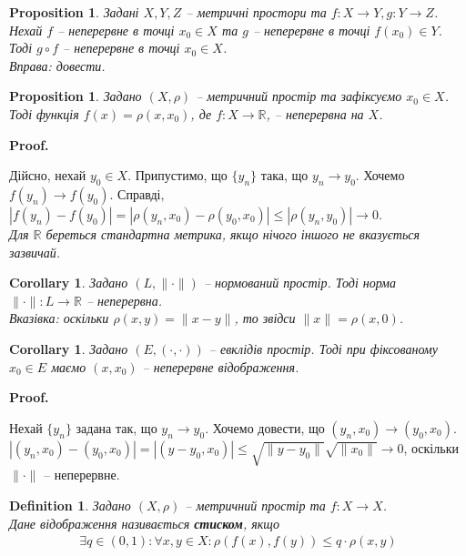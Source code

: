 \documentclass[a4paper, 10pt]{article}
\makeatletter
\theoremstyle{theoremdd}
\theoremstyle{theoremdd}
\newtheorem{definition}[theorem]{Definition}
\theoremstyle{theoremdd}
\theoremstyle{theoremdd}
\theoremstyle{theoremdd}
\newtheorem{proposition}[theorem]{Proposition}
\theoremstyle{theoremdd}
\theoremstyle{theoremdd}
\theoremstyle{theoremdd}
\newtheorem{corollary}[theorem]{Corollary}
\renewenvironment{proof}[1][Proof.\\]{\par
\pushQED{\hfill \qed}%
\normalfont \topsep6\p@\@plus6\p@\relax
\trivlist
\item\relax
{\bfseries
#1\@addpunct{.}}\hspace\labelsep\ignorespaces
}{%
\popQED\endtrivlist\@endpefalse
}
\makeatother
\begin{document}
\begin{proposition}
Задані $X,Y,Z$ -- метричні простори та $f \colon X \to Y, g \colon Y \to Z$. Нехай $f$ -- неперервне в точці $x_0 \in X$ та $g$ -- неперервне в точці $f(x_0) \in Y$. Тоді $g \circ f$ -- неперервне в точці $x_0 \in X$.\\
\textit{Вправа: довести.}
\end{proposition}

\begin{proposition}
Задано $(X,\rho)$ -- метричний простір та зафіксуємо $x_0 \in X$. Тоді функція $f(x) = \rho(x,x_0)$, де $f \colon X \to \mathbb{R}$, -- неперервна на $X$.
\end{proposition}

\begin{proof}
Дійсно, нехай $y_0 \in X$. Припустимо, що $\{y_n\}$ така, що  $y_n \to y_0$. Хочемо $f(y_n) \to f(y_0)$. Справді,\\
$|f(y_n) - f(y_0)| = |\rho(y_n,x_0) - \rho(y_0,x_0)| \leq |\rho(y_n,y_0)| \to 0$.\\
\textit{Для $\mathbb{R}$ береться стандартна метрика, якщо нічого іншого не вказується зазвичай.}
\end{proof}

\begin{corollary}
Задано $(L, \|\cdot \|)$ -- нормований простір. Тоді норма $\| \cdot \| \colon L \to \mathbb{R}$ -- неперервна.\\
\textit{Вказівка: оскільки $\rho(x,y) = \|x-y\|$, то звідси $\|x\| = \rho(x,0)$.}
\end{corollary}

\begin{corollary}
Задано $(E, (\cdot,\cdot))$ -- евклідів простір. Тоді при фіксованому $x_0 \in E$ маємо $(x,x_0)$ -- неперервне відображення.
\end{corollary}

\begin{proof}
Нехай $\{y_n\}$ задана так, що $y_n \to y_0$. Хочемо довести, що $(y_n,x_0) \to (y_0,x_0)$.\\
$|(y_n,x_0) - (y_0,x_0)| = |(y-y_0,x_0)| \leq \sqrt{\|y-y_0\|} \sqrt{\|x_0\|} \to 0$, оскільки $\| \cdot \|$ -- неперервне.
\end{proof}

\begin{definition}
Задано $(X,\rho)$ -- метричний простір та $f \colon X \to X$.\\
Дане відображення називається \textbf{стиском}, якщо
\begin{align*}
\exists q \in (0,1): \forall x,y \in X: \rho(f(x),f(y)) \leq q \cdot \rho(x,y)
\end{align*}
\end{definition}
\end{document}

